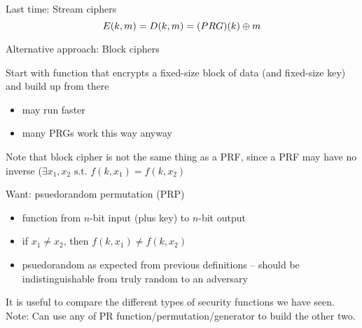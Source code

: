 

Last time: Stream ciphers
    $$E(k,m) = D(k, m) = \text(PRG)(k) \oplus m$$

Alternative approach: Block ciphers

Start with function that encrypts a fixed-size block of data (and fixed-size
        key) and build up from there
\begin{itemize}
    \item may run faster
    \item many PRGs work this way anyway
\end{itemize}

Note that block cipher is not the same thing as a PRF, since a PRF may have no
    inverse ($\exists x_1, x_2 \text{ s.t. } f(k,x_1) = f(k,x_2)$

Want: psuedorandom permutation (PRP)
\begin{itemize}
    \item function from $n$-bit input (plus key) to $n$-bit output
    \item if $x_1 \neq x_2$, then $f(k, x_1) \neq f(k, x_2)$
    \item psuedorandom as expected from previous definitions -- should be
        indistinguishable from truly random to an adversary
\end{itemize}

It is useful to compare the different types of security functions we have
seen. Note: Can use any of PR function/permutation/generator to build
the other two.

